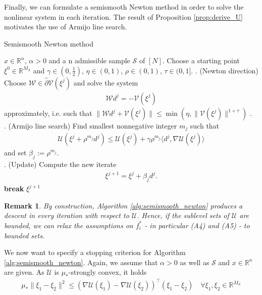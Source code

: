 \documentclass[12pt,a4paper,twoside]{article}
\makeatletter
\renewcommand*{\eqref}[1]{%
	\hyperref[{#1}]{\textup{\tagform@{\ref*{#1}}}}%
}
\theoremstyle{plain}
\newtheorem{rem}[thm]{Remark}
\theoremstyle{note}
\numberwithin{thm}{section}
\newcommand{\onehalf}{\frac{1}{2}}
\makeatother
\begin{document}
	Finally, we can formulate a semismooth Newton method in order to solve the nonlinear system \eqref{eqn:newton_equation} in each iteration. The result of Proposition \ref{prop:derive_U} motivates the use of Armijo line search.
	 
	\vspace{5mm}
	\begin{algorithm}[H]
		\caption{Semismooth Newton method}
		\label{alg:semismooth_newton}
		\begin{algorithmic}
		\REQUIRE $x \in \mathbb{R}^n$, $\alpha > 0$ and a n admissible sample $\mathcal{S}$ of $[N]$. Choose a starting point $\xi^0 \in \mathbb{R}^{M_\mathcal{S}}$ and $\gamma \in (0, \onehalf)$, $\eta \in (0, 1)$, $\rho \in (0, 1)$, $\tau \in (0, 1]$. 
		. (Newton direction) Choose $\mathcal{W} \in \hat{\partial} \mathcal{V}(\xi^j)$ and solve the system 
		\begin{align*}
		\mathcal{W}d^j = -\mathcal{V}(\xi^j) 
		\end{align*}
		approximately, i.e. such that $\|\mathcal{W}d^j + \mathcal{V}(\xi^j) \| \leq \min(\eta, \|\mathcal{V}(\xi^j)\|^{1+\tau} )$ .\\
		. (Armijo line search) Find smallest nonnegative integer $m_j$ such that
		\begin{align*}
		\mathcal{U}(\xi^j + \rho^{m_j} d^j) \leq \mathcal{U}(\xi^j) + \gamma\rho^{m_j} \langle d^j, \nabla \mathcal{U}(\xi^j) \rangle
		\end{align*}
		and set $\beta_j := \rho^{m_j}$.\\
		. (Update) Compute the new iterate 
		\begin{align*}
		\xi^{j+1} = \xi^j + \beta_j d^j.
		\end{align*}
		\STATE \textbf{break}
		\ENDIF
		\ENDFOR
		\RETURN $\xi^{j+1}$
		\end{algorithmic}
	\end{algorithm}
	\vspace{5mm}
	\begin{rem}
		\label{rem:relax_2}
		By construction, Algorithm \ref{alg:semismooth_newton} produces a descent in every iteration with respect to $\mathcal{U}$. Hence, if the sublevel sets of $\mathcal{U}$ are bounded, we can relax the assumptions on $f_i^\ast$ - in particular (A4) and (A5) - to bounded sets. 
	\end{rem}
	We now want to specify a stopping criterion for Algorithm \ref{alg:semismooth_newton}. Again, we assume that $\alpha >0$ as well as $\mathcal{S}$ and $x \in \mathbb{R}^n$ are given. As $\mathcal{U}$ is $\mu_\ast$-strongly convex, it holds
	\begin{align*}
	\mu_\ast \|\xi_1 - \xi_2 \|^2 \leq (\nabla\mathcal{U}(\xi_1) - \nabla\mathcal{U}(\xi_2))^\intercal (\xi_1 - \xi_2) \quad \forall \xi_1, \xi_2\in \mathbb{R}^{M_\mathcal{S}}
	\end{align*}
	
\end{document}

